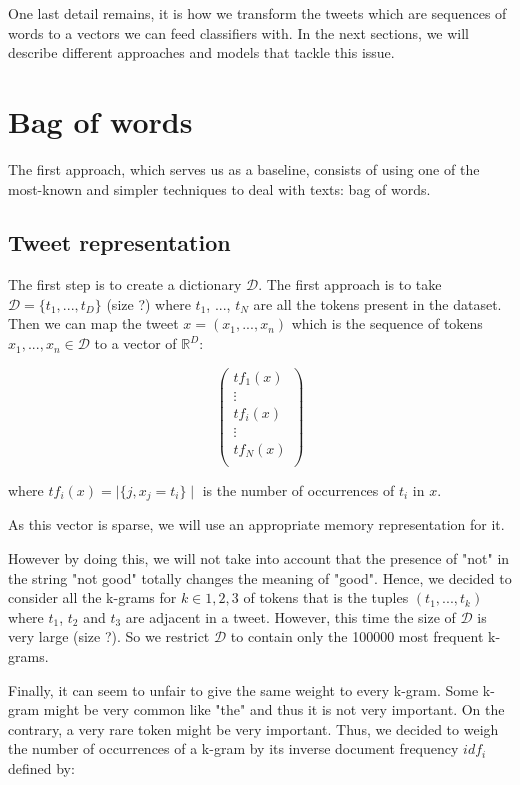 \documentclass[10pt,conference,compsocconf]{IEEEtran}
\begin{document}
One last detail remains, it is how we transform the tweets which are sequences of words to a vectors we can feed classifiers with. In the next sections, we will describe different approaches and models that tackle this issue.

\section{Bag of words}

The first approach, which serves us as a baseline, consists of using one of the most-known and simpler techniques to deal with texts: bag of words.

\subsection{Tweet representation}

The first step is to create a dictionary $\mathcal{D}$. The first approach is to take $\mathcal{D} = \{ t_1, ..., t_D \}$ (size ?) where $t_1$, ..., $t_N$ are all the tokens present in the dataset. Then we can map the tweet $x = (x_1, ..., x_n)$ which is the sequence of tokens $x_1, ..., x_n \in \mathcal{D}$ to a vector of $\mathbb{R}^D$:

$$
\left(
\begin{array}{c}
tf_1(x) \\
\vdots \\
tf_i(x) \\
\vdots \\
tf_N(x) \\
\end{array}
\right)
$$

where $tf_i(x) = \mid \{j, x_j = t_i \} \mid$ is the number of occurrences of $t_i$ in $x$.

As this vector is sparse, we will use an appropriate memory representation for it.

However by doing this, we will not take into account that the presence of "not" in the string "not good" totally changes the meaning of "good". Hence, we decided to consider all the k-grams for $k \in {1, 2, 3}$ of tokens that is the tuples $(t_1, ..., t_k)$ where $t_1$, $t_2$ and $t_3$ are adjacent in a tweet. However, this time the size of $\mathcal{D}$ is very large (size ?). So we restrict $\mathcal{D}$ to contain only the 100000 most frequent k-grams.

Finally, it can seem to unfair to give the same weight to every k-gram. Some k-gram might be very common like "the" and thus it is not very important. On the contrary, a very rare token might be very important. Thus, we decided to weigh the number of occurrences of a k-gram by its inverse document frequency $idf_i$ defined by:
\end{document}
